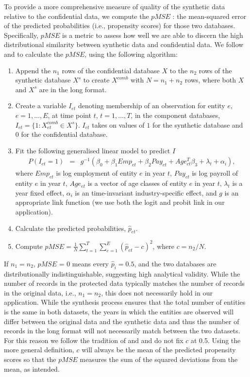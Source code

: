 To provide a more comprehensive measure of  quality of the synthetic data relative to the confidential data, we compute the $pMSE$ \parencite[propensity score mean-squared error,][]{Woo_Reiter_Oganian_Karr_2009,SnokeSlavkovic2018,Snoke_RSSA2018}: the mean-squared error of the predicted probabilities (i.e., propensity scores) for those two databases. Specifically, $pMSE$ is a metric to assess how well we are able to discern the high distributional similarity between synthetic data and confidential data. %
%
We follow  \textcite{Woo_Reiter_Oganian_Karr_2009} and \textcite{SnokeSlavkovic2018} to calculate the $pMSE$, using the following algorithm:  
\begin{enumerate}
    \item Append the $n_1$ rows of the confidential database $X$ to the $n_2$ rows of the synthetic database $X^s$ to create $X^{comb}$ with $N=n_1 + n_2$ rows, where both $X$ and $X^s$ are in the long format.
    \item Create a variable $I_{et}$ denoting membership of an observation for entity $e$, $e=1,\ldots,E$, at time point $t$, $t=1,\ldots,T$, in the component databases,  $I_{et}=\{1: X^{comb}_{et} \in X^s\}$. $I_{et}$ takes on values of $1$ for the synthetic database and $0$ for the confidential database. 
    \item Fit the following generalised linear model to predict $I$
    \begin{eqnarray}	
        P(I_{et}=1) & = &g^{-1}(\beta_0 + \beta_{1} Emp_{et} + \beta_{2} Pay_{et} + Age_{et}^{T}\beta_{3} + \lambda_t + \alpha_i), \label{pMSE}
     \end{eqnarray}
         where $Emp_{et}$ is  log employment  of entity $e$ in year $t$, $Pay_{et}$ is  log payroll of entity $e$ in year $t$, $Age_{et}$ is a vector of age classes of entity $e$ in year $t$, $\lambda_t$ is a year fixed effect, $\alpha_i$ is an time-invariant industry-specific effect, and $g$ is an appropriate link function (we use both the logit and probit link in our application). 
    \item Calculate the predicted probabilities, $\hat{p}_{et}$.
    \item Compute  $pMSE=\frac{1}{N}\sum_{t=1}^T\sum_{e=1}^E(\hat{p}_{et} - c)^2$, where $c=n_2/N$.
\end{enumerate}
If $n_1 = n_2$, $pMSE$ = 0 means every $\hat{p}_i = 0.5$, and the two databases are distributionally indistinguishable, suggesting  high analytical validity. While the number of records in the protected data typically matches the number of records in the original data, i.e., $n_1 = n_2$, this does not necessarily hold in our application. While the synthesis process ensures that the total number of entities is the same in both datasets, the years in which the entities are observed will differ between the original data and the synthetic data and thus the number of records in the long format will not necessarily match between the two datasets. For this reason we follow the tradition of\citet{Woo_Reiter_Oganian_Karr_2009} and \citet{Snoke_RSSA2018} and do not fix $c$ at 0.5. Using the more general definition, $c$ will always be the mean of the predicted propensity scores so that the $pMSE$ measures the sum of the squared deviations from the mean, as intended. 

